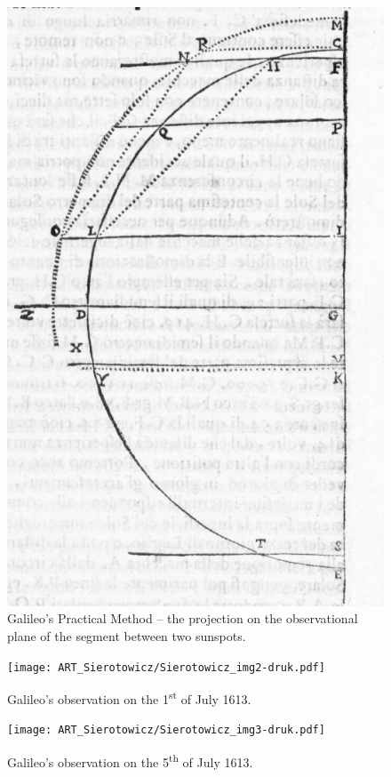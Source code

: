 \begin{artengenv}
\begin{figure}[h]
	\centering
	\includegraphics[width=1\textwidth]{ART_Sierotowicz/Sierotowicz_img1-druk.pdf} 
	\caption{Galileo’s Practical Method -- the projection on the observational plane of the segment between two sunspots.}
	\label{sier-fig1}
\end{figure}

\begin{figure}[h]
	\centering
	\texttt{[image: ART\_Sierotowicz/Sierotowicz\_img2-druk.pdf]} 
	\caption{Galileo’s observation on the 1\textsuperscript{st} of July 1613.}
	\label{sier-fig2}
\end{figure}

\begin{figure}[h]
	\centering
	\texttt{[image: ART\_Sierotowicz/Sierotowicz\_img3-druk.pdf]} 
	\caption{Galileo’s observation on the 5\textsuperscript{th} of July 1613.}
	\label{sier-fig3}
\end{figure}


\end{artengenv}
